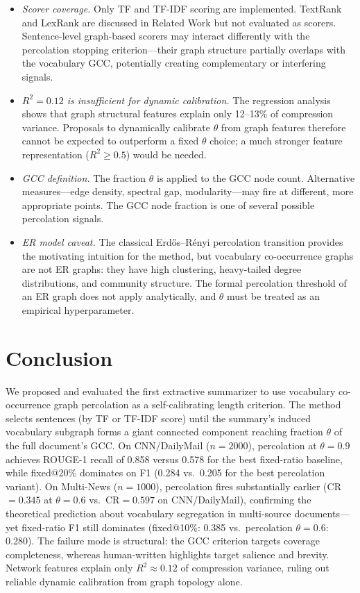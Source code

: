 \documentclass[11pt,letterpaper]{article}
\begin{document}
\begin{itemize}
  \item \textit{Scorer coverage.} Only TF and TF-IDF scoring are implemented. TextRank
    and LexRank are discussed in Related Work but not evaluated as scorers. Sentence-level
    graph-based scorers may interact differently with the percolation stopping
    criterion---their graph structure partially overlaps with the vocabulary GCC,
    potentially creating complementary or interfering signals.

  \item \textit{$R^2=0.12$ is insufficient for dynamic calibration.} The regression
    analysis shows that graph structural features explain only 12--13\% of compression
    variance. Proposals to dynamically calibrate $\theta$ from graph features therefore
    cannot be expected to outperform a fixed $\theta$ choice; a much stronger feature
    representation ($R^2\ge 0.5$) would be needed.

  \item \textit{GCC definition.} The fraction $\theta$ is applied to the GCC node count.
    Alternative measures---edge density, spectral gap, modularity---may fire at different,
    more appropriate points. The GCC node fraction is one of several possible percolation
    signals.

  \item \textit{ER model caveat.} The classical Erd{\H o}s--R\'enyi percolation
    transition provides the motivating intuition for the method, but vocabulary
    co-occurrence graphs are not ER graphs: they have high clustering, heavy-tailed degree
    distributions, and community structure. The formal percolation threshold of an ER
    graph does not apply analytically, and $\theta$ must be treated as an empirical
    hyperparameter.
\end{itemize}

\section{Conclusion}

We proposed and evaluated the first extractive summarizer to use vocabulary co-occurrence
graph percolation as a self-calibrating length criterion. The method selects sentences
(by TF or TF-IDF score) until the summary's induced vocabulary subgraph forms a giant
connected component reaching fraction $\theta$ of the full document's GCC. On
CNN/DailyMail ($n=2000$), percolation at $\theta{=}0.9$ achieves ROUGE-1 recall of
0.858 versus 0.578 for the best fixed-ratio baseline, while fixed@20\% dominates on F1
(0.284 vs.\ 0.205 for the best percolation variant). On Multi-News ($n=1000$), percolation
fires substantially earlier (CR$=0.345$ at $\theta{=}0.6$ vs.\ CR$=0.597$ on
CNN/DailyMail), confirming the theoretical prediction about vocabulary segregation in
multi-source documents---yet fixed-ratio F1 still dominates (fixed@10\%: 0.385 vs.\
percolation $\theta{=}0.6$: 0.280). The failure mode is structural: the GCC criterion
targets coverage completeness, whereas human-written highlights target salience and
brevity. Network features explain only $R^2\approx 0.12$ of compression variance, ruling
out reliable dynamic calibration from graph topology alone.
\end{document}
